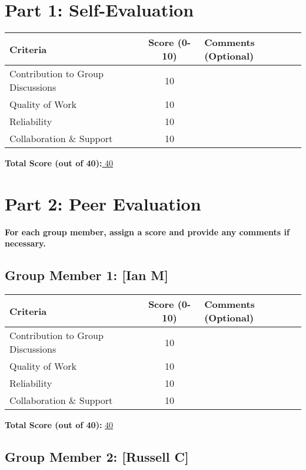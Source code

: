\documentclass{article}
\begin{document}
\section*{Part 1: Self-Evaluation}

\begin{tabular}{|l|c|p{7cm}|}
\hline
\textbf{Criteria} & \textbf{Score (0-10)} & \textbf{Comments (Optional)} \\ \hline
Contribution to Group Discussions & 10 & \\ \hline
Quality of Work & 10 & \\ \hline
Reliability & 10 & \\ \hline
Collaboration \& Support & 10 & \\ \hline
\end{tabular}

\vspace{0.5cm}
\textbf{Total Score (out of 40):}\underline{\hspace{1cm} 40}

\section*{Part 2: Peer Evaluation}

\textbf{For each group member, assign a score and provide any comments if necessary.}

\subsection*{Group Member 1: [Ian M]}

\begin{tabular}{|l|c|p{7cm}|}
\hline
\textbf{Criteria} & \textbf{Score (0-10)} & \textbf{Comments (Optional)} \\ \hline
Contribution to Group Discussions & 10 & \\ \hline
Quality of Work & 10 & \\ \hline
Reliability & 10 & \\ \hline
Collaboration \& Support & 10 & \\ \hline
\end{tabular}

\vspace{0.5cm}
\textbf{Total Score (out of 40):} \underline{\hspace{0.5cm} 40}

\subsection*{Group Member 2: [Russell C]}
\end{document}

